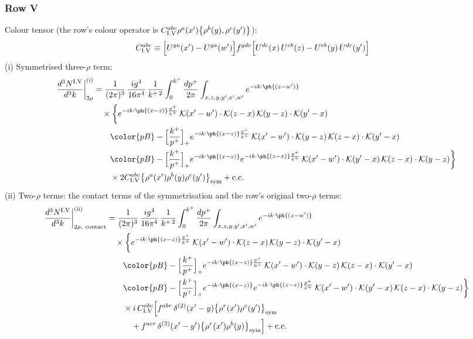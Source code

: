 \subsubsection*{Row V}
Colour tensor (the row's colour operator is $C^{abc}_{{\rm I.V}}\rho^{a}(x')\big\{\rho^{b}(y),\rho^{c}(y')\big\}$):
\begin{align}
C^{abc}_{{\rm I.V}}&\equiv \Big[U^{ga}(x')-U^{ga}(w')\Big]f^{gde}\Big[U^{dc}(x)\,U^{eb}(z)-U^{eb}(y)\,U^{dc}(y')\Big]\notag
\end{align}
(i) Symmetrised three-$\rho$ term:
\begin{align}
\frac{d^{3}N^{\rm I.V}}{d^{3}k}\bigg|^{\rm (i)}_{3\rho}&=\frac{1}{(2\pi)^{3}}\,\frac{ig^{4}}{16\pi^{4}}\,\frac{1}{k^{+\,2}}\int_{0}^{k^{+}}\frac{dp^{+}}{2\pi}\int_{x,z,y,y',x',w'}e^{-ik\cdot\ph{(z-w')}}\notag\\
&\quad\times\bigg\{e^{-ik\cdot\ph{(x-z)}\frac{p^{+}}{k^{+}}}\,\mathcal{K}(x'-w')\cdot\mathcal{K}(z-x)\,\mathcal{K}(y-z)\cdot\mathcal{K}(y'-x)\notag\\
&\qquad{\color{pB}-\Big[\frac{k^{+}}{p^{+}}\Big]_{+}e^{-ik\cdot\ph{(x-z)}\frac{p^{+}}{k^{+}}}\,\mathcal{K}(x'-w')\cdot\mathcal{K}(y-z)\,\mathcal{K}(z-x)\cdot\mathcal{K}(y'-x)}\notag\\
&\qquad{\color{pB}-\Big[\frac{k^{+}}{p^{+}}\Big]_{+}e^{-ik\cdot\ph{(x-z)}}e^{-ik\cdot\ph{(z-x)}\frac{p^{+}}{k^{+}}}\,\mathcal{K}(x'-w')\cdot\mathcal{K}(y'-x)\,\mathcal{K}(z-x)\cdot\mathcal{K}(y-z)}\bigg\}\notag\\
&\qquad\times 2C^{abc}_{{\rm I.V}}\big\{\rho^{a}(x')\rho^{b}(y)\rho^{c}(y')\big\}_{\rm sym}+{\rm c.c.}\label{eq:D-I.V-3}
\end{align}
(ii) Two-$\rho$ terms: the contact terms of the symmetrisation and the row's original two-$\rho$ terms:
\begin{align}
\frac{d^{3}N^{\rm I.V}}{d^{3}k}\bigg|^{\rm (ii)}_{2\rho,\ {\rm contact}}&=\frac{1}{(2\pi)^{3}}\,\frac{ig^{4}}{16\pi^{4}}\,\frac{1}{k^{+\,2}}\int_{0}^{k^{+}}\frac{dp^{+}}{2\pi}\int_{x,z,y,y',x',w'}e^{-ik\cdot\ph{(z-w')}}\notag\\
&\quad\times\bigg\{e^{-ik\cdot\ph{(x-z)}\frac{p^{+}}{k^{+}}}\,\mathcal{K}(x'-w')\cdot\mathcal{K}(z-x)\,\mathcal{K}(y-z)\cdot\mathcal{K}(y'-x)\notag\\
&\qquad{\color{pB}-\Big[\frac{k^{+}}{p^{+}}\Big]_{+}e^{-ik\cdot\ph{(x-z)}\frac{p^{+}}{k^{+}}}\,\mathcal{K}(x'-w')\cdot\mathcal{K}(y-z)\,\mathcal{K}(z-x)\cdot\mathcal{K}(y'-x)}\notag\\
&\qquad{\color{pB}-\Big[\frac{k^{+}}{p^{+}}\Big]_{+}e^{-ik\cdot\ph{(x-z)}}e^{-ik\cdot\ph{(z-x)}\frac{p^{+}}{k^{+}}}\,\mathcal{K}(x'-w')\cdot\mathcal{K}(y'-x)\,\mathcal{K}(z-x)\cdot\mathcal{K}(y-z)}\bigg\}\notag\\
&\qquad\times i\,C^{abc}_{{\rm I.V}}\Big[f^{abr}\,\delta^{(2)}(x'-y)\big\{\rho^{r}(x')\rho^{c}(y')\big\}_{\rm sym}\notag\\
&\qquad\quad +f^{acr}\,\delta^{(2)}(x'-y')\big\{\rho^{r}(x')\rho^{b}(y)\big\}_{\rm sym}\Big]+{\rm c.c.}\label{eq:D-I.V-2}
\end{align}
